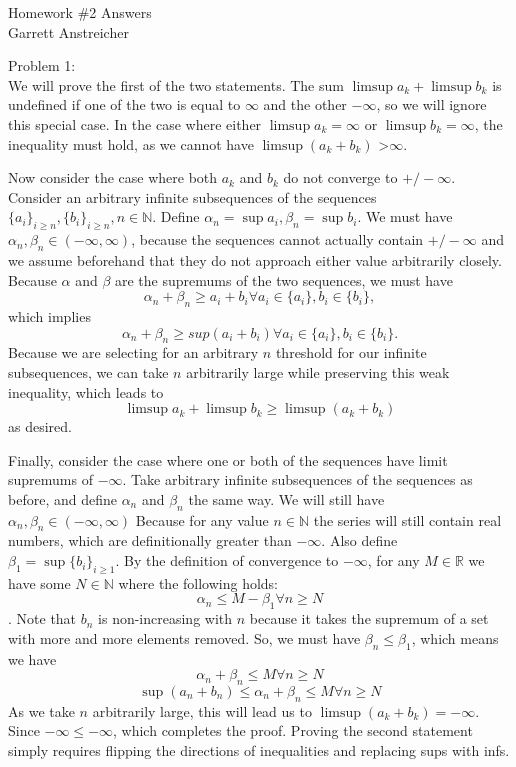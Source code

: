 \documentclass[12pt,leqno]{article}
\begin{document}
\begin{center}
\Large{Homework {\#}2 Answers}\\
\large{Garrett Anstreicher}
\end{center}

\bigskip

\noindent Problem 1:\\
\indent We will prove the first of the two statements. The sum $\limsup a_k + \limsup b_k$ is undefined if one of the two is equal to $\infty$ and the other $-\infty$, so we will ignore this special case. In the case where either $\limsup a_k = \infty$ or $\limsup b_k = \infty$, the inequality must hold, as we cannot have $\limsup(a_k + b_k)$ \textgreater $\infty$.

Now consider the case where both $a_k$ and $b_k$ do not converge to $+/- \infty$. Consider an arbitrary infinite subsequences of the sequences $\{a_i\}_{i\geq n}, \{b_i\}_{i\geq n}, n \in \mathds{N}$. Define $\alpha_n = \sup a_i, \beta_n = \sup b_i$. We must have $\alpha_n, \beta_n \in (-\infty, \infty)$, because the sequences cannot actually contain $+/-\infty$ and we assume beforehand that they do not approach either value arbitrarily closely. Because $\alpha$ and $\beta$ are the supremums of the two sequences, we must have
$$\alpha_n + \beta_n \geq a_i + b_i \forall a_i \in \{a_i\}, b_i \in \{b_i\},$$
which implies
$$\alpha_n + \beta_n \geq sup(a_i + b_i) \forall a_i \in \{a_i\}, b_i \in \{b_i\}.$$
Because we are selecting for an arbitrary $n$ threshold for our infinite subsequences, we can take $n$ arbitrarily large while preserving this weak inequality, which leads to
$$\limsup a_k + \limsup b_k \geq \limsup(a_k + b_k)$$
as desired.

Finally, consider the case where one or both of the sequences have limit supremums of $-\infty.$ Take arbitrary infinite subsequences of the sequences as before, and define $\alpha_n$ and $\beta_n$ the same way. We will still have $\alpha_n, \beta_n \in (-\infty, \infty)$ Because for any value $n \in \mathds{N}$ the series will still contain real numbers, which are definitionally greater than $-\infty$. Also define $\beta_1 = \sup \{b_i\}_{i \geq 1}.$ By the definition of convergence to $-\infty$, for any $M \in \mathds{R}$ we have some $N \in \mathds{N}$ where the following holds:
$$\alpha_n \leq M - \beta_1 \forall n\geq N$$.
Note that $b_n$ is non-increasing with $n$ because it takes the supremum of a set with more and more elements removed. So, we must have $\beta_n \leq \beta_1$, which means we have 
$$\alpha_n + \beta_n \leq M \forall n\geq N$$
$$\sup(a_n + b_n) \leq \alpha_n + \beta_n \leq M \forall n\geq N$$
As we take $n$ arbitrarily large, this will lead us to $\limsup(a_k + b_k) = -\infty$. Since $-\infty \leq -\infty$, which completes the proof. Proving the second statement simply requires flipping the directions of inequalities and replacing sups with infs.
\end{document}

